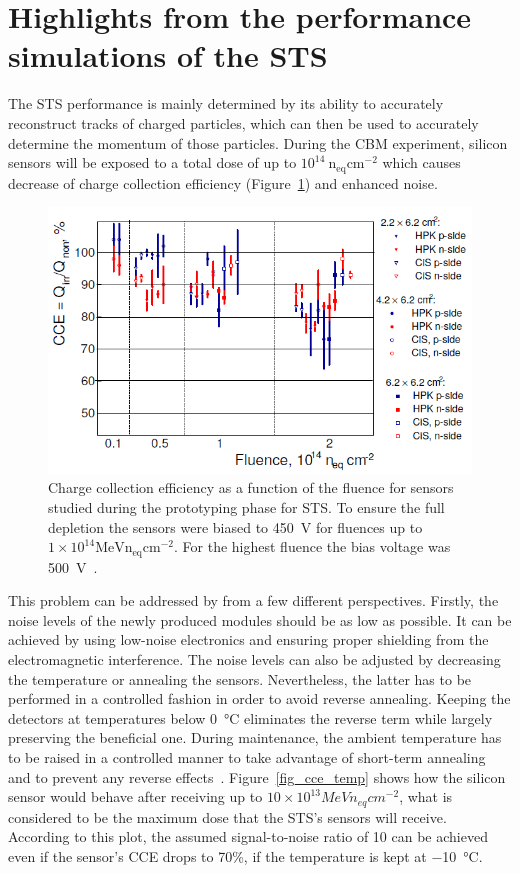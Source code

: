 \section{Highlights from the performance simulations of the STS}
The STS performance is mainly determined by its ability to accurately reconstruct tracks of charged particles, which can then be used to accurately determine the momentum of those particles. During the \gls{CBM} experiment, silicon sensors will be exposed to a total dose of up to $10^{14}~\mathrm{n_{eq}cm^{-2}}$ which causes decrease of charge collection efficiency (Figure~\ref{fig_cce}) and enhanced noise. 

\begin{figure}[!h]
\centering
\includegraphics[width=0.8\columnwidth]{Chapter2/images/CCE.png}
\caption{Charge collection efficiency as a function of the fluence for sensors studied during the prototyping phase for \gls{STS}. To ensure the full depletion the sensors were biased to 450~V for fluences up to $1\times10^14\mathrm{MeV n_{eq}cm^{-2}}$. For the highest fluence the bias voltage was 500~V~\cite{Momot:2019lnx}.}
\label{fig_cce}
\end{figure}

This problem can be addressed by from a few different perspectives. Firstly, the noise levels of the newly produced modules should be as low as possible. It can be achieved by using low-noise electronics and ensuring proper shielding from the electromagnetic interference. The noise levels can also be adjusted by decreasing the temperature or annealing the sensors. Nevertheless, the latter has to be performed in a controlled fashion in order to avoid reverse annealing. Keeping the detectors at temperatures below \SI{0}{\celsius} eliminates the reverse term while largely preserving the beneficial one. During maintenance, the ambient temperature has to be raised in a controlled manner to take advantage of short-term annealing and to prevent any reverse effects~\cite{Hartmann:2017gzy}. Figure~\ref{fig_cce_temp} shows how the silicon sensor would behave after receiving up to $10\times10^{13} MeV n_{eq}cm^{-2}$, what is considered to be the maximum dose that the \gls{STS}'s sensors will receive. According to this plot, the assumed signal-to-noise ratio of 10 can be achieved even if the sensor's \gls{CCE} drops to 70\%, if the temperature is kept at \SI{-10}{\celsius}.

